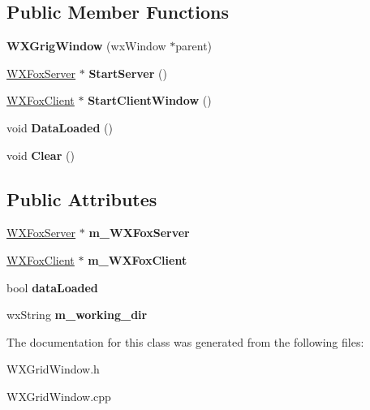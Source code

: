 \subsection*{Public Member Functions}
\begin{DoxyCompactItemize}
\item 
\mbox{\label{class_w_x_grig_window_a33b900e9f1b8e6e5957c53fcf360455a}} 
{\bfseries W\+X\+Grig\+Window} (wx\+Window $\ast$parent)
\item 
\mbox{\label{class_w_x_grig_window_aad9fd2cad409c83439981f3510b963a5}} 
\mbox{\hyperlink{class_w_x_fox_server}{W\+X\+Fox\+Server}} $\ast$ {\bfseries Start\+Server} ()
\item 
\mbox{\label{class_w_x_grig_window_a92a53acabea217af83aed3df321f1cac}} 
\mbox{\hyperlink{class_w_x_fox_client}{W\+X\+Fox\+Client}} $\ast$ {\bfseries Start\+Client\+Window} ()
\item 
\mbox{\label{class_w_x_grig_window_a93da58efcff5f060ab269ee05ba230f3}} 
void {\bfseries Data\+Loaded} ()
\item 
\mbox{\label{class_w_x_grig_window_abd2aec78c6d72511538cd748399c4b71}} 
void {\bfseries Clear} ()
\end{DoxyCompactItemize}
\subsection*{Public Attributes}
\begin{DoxyCompactItemize}
\item 
\mbox{\label{class_w_x_grig_window_ad681112aefbffdc8eed334dcc8acae92}} 
\mbox{\hyperlink{class_w_x_fox_server}{W\+X\+Fox\+Server}} $\ast$ {\bfseries m\+\_\+\+W\+X\+Fox\+Server}
\item 
\mbox{\label{class_w_x_grig_window_a4c82b788adeb7f89d7394e6726eff48a}} 
\mbox{\hyperlink{class_w_x_fox_client}{W\+X\+Fox\+Client}} $\ast$ {\bfseries m\+\_\+\+W\+X\+Fox\+Client}
\item 
\mbox{\label{class_w_x_grig_window_a71937b4f6c33689972427ff88c155b36}} 
bool {\bfseries data\+Loaded}
\item 
\mbox{\label{class_w_x_grig_window_a648de7af274cd7870869efd1517ba84d}} 
wx\+String {\bfseries m\+\_\+working\+\_\+dir}
\end{DoxyCompactItemize}


The documentation for this class was generated from the following files\+:\begin{DoxyCompactItemize}
\item 
W\+X\+Grid\+Window.\+h\item 
W\+X\+Grid\+Window.\+cpp\end{DoxyCompactItemize}
